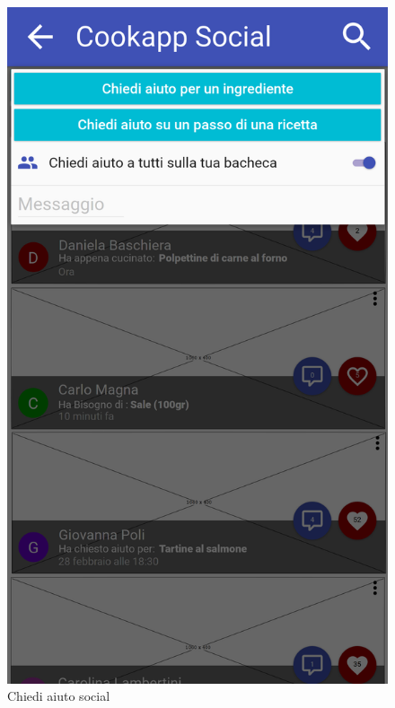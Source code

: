 \begin{figure}[H]
\begin{minipage}{.49\textwidth}
		\includegraphics[width=\textwidth]{img/wireframe/chiedi_aiuto_social_a_tutti.png}
		\caption{Chiedi aiuto social}
	\end{minipage}
\end{figure}

